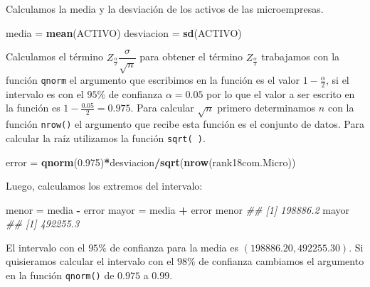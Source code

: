 \documentclass[letterpaper,]{book}
\newenvironment{Shaded}{\begin{snugshade}}{\end{snugshade}}
\newcommand{\CommentTok}[1]{\textcolor[rgb]{0.56,0.35,0.01}{\textit{#1}}}
\newcommand{\FloatTok}[1]{\textcolor[rgb]{0.00,0.00,0.81}{#1}}
\newcommand{\KeywordTok}[1]{\textcolor[rgb]{0.13,0.29,0.53}{\textbf{#1}}}
\newcommand{\NormalTok}[1]{#1}
\newcommand{\OperatorTok}[1]{\textcolor[rgb]{0.81,0.36,0.00}{\textbf{#1}}}
\newcommand{\StringTok}[1]{\textcolor[rgb]{0.31,0.60,0.02}{#1}}
\begin{document}
Calculamos la media y la desviación de los activos de las microempresas.

\begin{Shaded}
\begin{Highlighting}[]
\NormalTok{media =}\StringTok{ }\KeywordTok{mean}\NormalTok{(ACTIVO)}
\NormalTok{desviacion =}\StringTok{ }\KeywordTok{sd}\NormalTok{(ACTIVO)}
\end{Highlighting}
\end{Shaded}

Calculamos el término \(Z_{\frac{\alpha}{2}}\dfrac{\sigma}{\sqrt{n}}\) para obtener el término \(Z_{\frac{\alpha}{2}}\) trabajamos con la función \texttt{qnorm} el argumento que escribimos en la función es el valor \(1-\frac{\alpha}{2}\), si el intervalo es con el \(95\%\) de confianza \(\alpha=0.05\) por lo que el valor a ser escrito en la función es \(1-\frac{0.05}{2}=0.975\). Para calcular \(\sqrt{n}\) primero determinamos \(n\) con la función \texttt{nrow()} el argumento que recibe esta función es el conjunto de datos. Para calcular la raíz utilizamos la función \texttt{sqrt(\ )}.

\begin{Shaded}
\begin{Highlighting}[]
\NormalTok{error  =}\StringTok{ }\KeywordTok{qnorm}\NormalTok{(}\FloatTok{0.975}\NormalTok{)}\OperatorTok{*}\NormalTok{desviacion}\OperatorTok{/}\KeywordTok{sqrt}\NormalTok{(}\KeywordTok{nrow}\NormalTok{(rank18com.Micro))}
\end{Highlighting}
\end{Shaded}

Luego, calculamos los extremos del intervalo:

\begin{Shaded}
\begin{Highlighting}[]

\NormalTok{menor =}\StringTok{ }\NormalTok{media }\OperatorTok{-}\StringTok{ }\NormalTok{error}
\NormalTok{mayor =}\StringTok{ }\NormalTok{media }\OperatorTok{+}\StringTok{ }\NormalTok{error}
\NormalTok{menor}
\CommentTok{## [1] 198886.2}
\NormalTok{mayor}
\CommentTok{## [1] 492255.3}
\end{Highlighting}
\end{Shaded}

El intervalo con el \(95\%\) de confianza para la media es \(\left( 198886.20, 492255.30 \right)\). Si quisieramos calcular el intervalo con el \(98\%\) de confianza cambiamos el argumento en la función \texttt{qnorm()} de \(0.975\) a \(0.99\).
\end{document}
